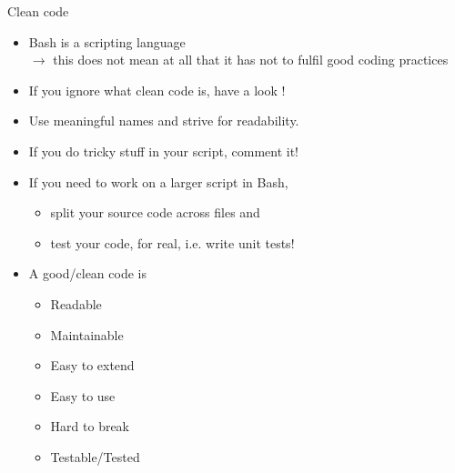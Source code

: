 \begin{frame}{Clean code}
    \vspace{-3mm}
    \begin{itemize}
        \setlength{\itemsep}{1mm}
        \item Bash is a scripting language\\ $\to$ this does not mean at all that it has not to fulfil good coding practices
        \item If you ignore what clean code is, have a look !
        \item Use meaningful names and strive for readability.
        \item If you do tricky stuff in your script, comment it!
        \item If you need to work on a larger script in Bash,
              \begin{itemize}
                  \item split your source code across files and
                  \item test your code, for real, i.e. write unit tests!\\ 
              \end{itemize}
        \item A good/clean code is
              \begin{itemize}
                  \item Readable
                  \item Maintainable
                  \item Easy to extend
                  \item Easy to use
                  \item Hard to break
                  \item Testable/Tested
              \end{itemize}
    \end{itemize}
\end{frame}















